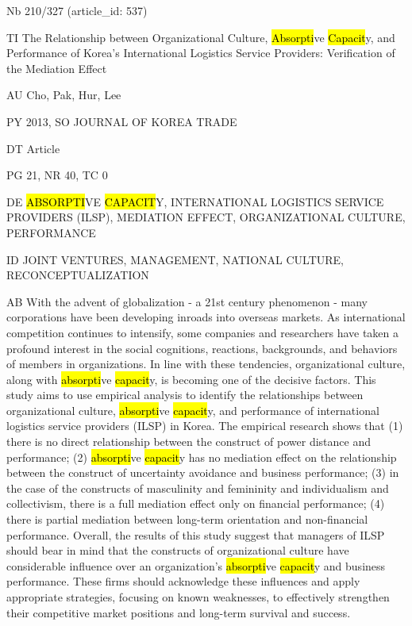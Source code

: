 \documentclass[a4paper]{article}
\begin{document}
\vspace*{-2cm}
Nb \tabto{0cm}210/327 (article\_id: 537)\par
TI \tabto{0cm}The Relationship between Organizational Culture, \hl{Absorpti}ve \hl{Capacit}y, and Performance of Korea's International Logistics Service Providers: Verification of the Mediation Effect\par
AU \tabto{0cm}Cho, Pak, Hur, Lee\par
PY \tabto{0cm}2013, SO JOURNAL OF KOREA TRADE\par
DT \tabto{0cm}Article\par
PG \tabto{0cm}21, NR 40, TC 0\par
DE \tabto{0cm}\hl{ABSORPTI}VE \hl{CAPACIT}Y, INTERNATIONAL LOGISTICS SERVICE PROVIDERS (ILSP), MEDIATION EFFECT, ORGANIZATIONAL CULTURE, PERFORMANCE\par
ID \tabto{0cm}JOINT VENTURES, MANAGEMENT, NATIONAL CULTURE, RECONCEPTUALIZATION\par
AB \tabto{0cm}With the advent of globalization - a 21st century phenomenon - many corporations have been developing inroads into overseas markets. As international competition continues to intensify, some companies and researchers have taken a profound interest in the social cognitions, reactions, backgrounds, and behaviors of members in organizations. In line with these tendencies, organizational culture, along with \hl{absorpti}ve \hl{capacit}y, is becoming one of the decisive factors. This study aims to use empirical analysis to identify the relationships between organizational culture, \hl{absorpti}ve \hl{capacit}y, and performance of international logistics service providers (ILSP) in Korea.
The empirical research shows that (1) there is no direct relationship between the construct of power distance and performance; (2) \hl{absorpti}ve \hl{capacit}y has no mediation effect on the relationship between the construct of uncertainty avoidance and business performance; (3) in the case of the constructs of masculinity and femininity and individualism and collectivism, there is a full mediation effect only on financial performance; (4) there is partial mediation between long-term orientation and non-financial performance.
Overall, the results of this study suggest that managers of ILSP should bear in mind that the constructs of organizational culture have considerable influence over an organization's \hl{absorpti}ve \hl{capacit}y and business performance. These firms should acknowledge these influences and apply appropriate strategies, focusing on known weaknesses, to effectively strengthen their competitive market positions and long-term survival and success.\par
\clearpage
\end{document}
